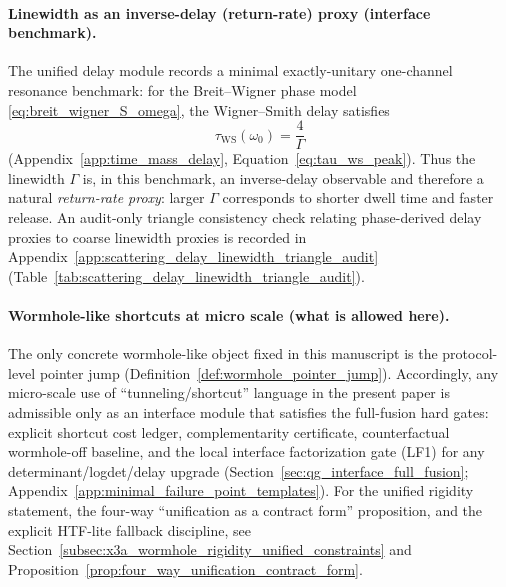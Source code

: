 \paragraph{Linewidth as an inverse-delay (return-rate) proxy (interface benchmark).}
\InterfaceTag The unified delay module records a minimal exactly-unitary one-channel resonance benchmark:
for the Breit--Wigner phase model \eqref{eq:breit_wigner_S_omega}, the Wigner--Smith delay satisfies
\[
\tau_{\mathrm{WS}}(\omega_0)=\frac{4}{\Gamma}
\]
(Appendix~\ref{app:time_mass_delay}, Equation~\eqref{eq:tau_ws_peak}).
Thus the linewidth $\Gamma$ is, in this benchmark, an inverse-delay observable and therefore a natural \emph{return-rate proxy}:
larger $\Gamma$ corresponds to shorter dwell time and faster release.
An audit-only triangle consistency check relating phase-derived delay proxies to coarse linewidth proxies is recorded in
Appendix~\ref{app:scattering_delay_linewidth_triangle_audit} (Table~\ref{tab:scattering_delay_linewidth_triangle_audit}).

\paragraph{Wormhole-like shortcuts at micro scale (what is allowed here).}
\InterfaceTag The only concrete wormhole-like object fixed in this manuscript is the protocol-level pointer jump
(Definition~\ref{def:wormhole_pointer_jump}).
Accordingly, any micro-scale use of ``tunneling/shortcut'' language in the present paper is admissible only as an interface module
that satisfies the full-fusion hard gates: explicit shortcut cost ledger, complementarity certificate, counterfactual wormhole-off baseline,
and the local interface factorization gate (LF1) for any determinant/logdet/delay upgrade (Section~\ref{sec:qg_interface_full_fusion};
Appendix~\ref{app:minimal_failure_point_templates}).
For the unified rigidity statement, the four-way ``unification as a contract form'' proposition, and the explicit HTF-lite fallback discipline, see
Section~\ref{subsec:x3a_wormhole_rigidity_unified_constraints} and Proposition~\ref{prop:four_way_unification_contract_form}.

